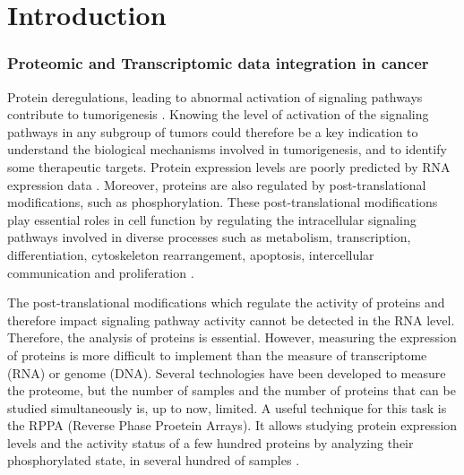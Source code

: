 \section{Introduction}


\subsubsection*{Proteomic and Transcriptomic data integration in cancer}

Protein deregulations, leading to abnormal activation of signaling
pathways contribute to tumorigenesis
\citep{giancotti2014deregulation}. Knowing the level of activation of
the signaling pathways in any subgroup of tumors could therefore be a
key indication to understand the biological mechanisms involved in
tumorigenesis, and to identify some therapeutic targets.  Protein
expression levels are poorly predicted by RNA expression data
\citep{akbani2014pan}. Moreover, proteins are also regulated by
post-translational modifications, such as phosphorylation.  These
post-translational modifications play essential roles in cell function
by regulating the intracellular signaling pathways involved in diverse
processes such as metabolism, transcription, differentiation,
cytoskeleton rearrangement, apoptosis, intercellular communication and
proliferation \citep{johnson2009regulation}.

The post-translational modifications which regulate the activity of
proteins and therefore impact signaling pathway activity cannot be
detected in the RNA level.  Therefore, the analysis of proteins is
essential.  However, measuring the expression of proteins is more
difficult to implement than the measure of transcriptome (RNA) or
genome (DNA).  Several technologies have been developed to measure the
proteome, but the number of samples and the number of proteins that
can be studied simultaneously is, up to now, limited.  A useful
technique for this task is the RPPA (Reverse Phase Proetein
Arrays). It allows studying protein expression levels and the activity
status of a few hundred proteins by analyzing their phosphorylated
state, in several hundred of samples \citep{akbani2014realizing}.

